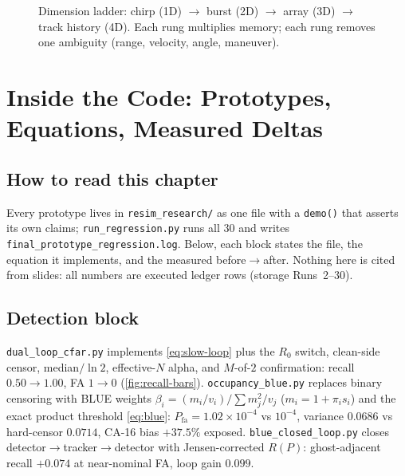 \documentclass[11pt,oneside]{book}
\begin{document}
\begin{figure}[htbp]
\centering
{}
\caption{Dimension ladder: chirp (1D) $\to$ burst (2D) $\to$ array (3D)
$\to$ track history (4D). Each rung multiplies memory; each rung removes
one ambiguity (range, velocity, angle, maneuver).}
\label{fig:tensor}
\end{figure}

\chapter{Inside the Code: Prototypes, Equations, Measured Deltas}
\label{ch:code}

\section{How to read this chapter}
\label{sec:code-howto}

Every prototype lives in \texttt{resim\_research/} as one file with a
\texttt{demo()} that asserts its own claims; \texttt{run\_regression.py}
runs all 30 and writes \texttt{final\_prototype\_regression.log}. Below,
each block states the file, the equation it implements, and the measured
before$\to$after. Nothing here is cited from slides: all numbers are
executed ledger rows (storage Runs~2--30).

\section{Detection block}
\label{sec:code-detection}

\texttt{dual\_loop\_cfar.py} implements \cref{eq:slow-loop} plus the
$R_0$ switch, clean-side censor, median$/\ln2$, effective-$N$ alpha, and
$M$-of-$2$ confirmation: recall $0.50\to1.00$, FA $1\to0$
(\cref{fig:recall-bars}). \texttt{occupancy\_blue.py} replaces binary
censoring with BLUE weights
$\beta_i=(m_i/v_i)/\sum m_j^2/v_j$ ($m_i=1+\pi_is_i$) and the exact product
threshold \cref{eq:blue}: $P_{\mathrm{fa}}=1.02\times10^{-4}$ vs $10^{-4}$,
variance $0.0686$ vs hard-censor $0.0714$, CA-16 bias $+37.5\%$ exposed.
\texttt{blue\_closed\_loop.py} closes detector$\to$tracker$\to$detector with
Jensen-corrected $R(P)$: ghost-adjacent recall $+0.074$ at near-nominal FA,
loop gain $0.099$.
\end{document}
